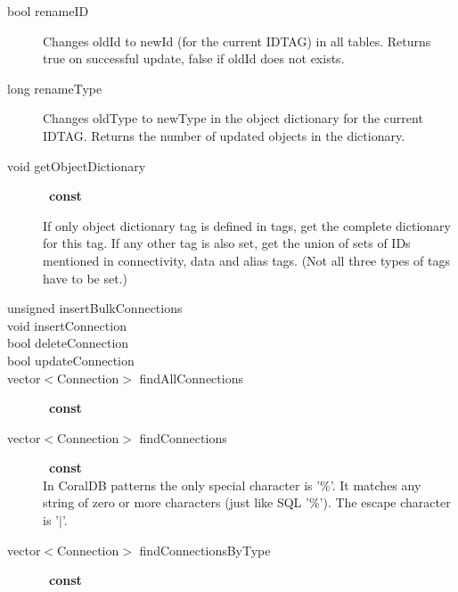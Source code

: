 \begin{description}
\item[bool renameID]
Changes oldId to newId (for the current IDTAG) in all tables.  Returns
true on successful update, false if oldId does not exists.

\item[long renameType]
Changes oldType to newType in the object dictionary for the current
IDTAG.  Returns the number of updated objects in the dictionary.


\item[void getObjectDictionary]~\textbf{const}

  If only object dictionary tag is defined in tags, get the complete
  dictionary for this tag.  If any other tag is also set, get the
  union of sets of IDs mentioned in connectivity, data and alias tags.
  (Not all three types of tags have to be set.)
  
\item[unsigned insertBulkConnections]


\item[void insertConnection]
\item[bool deleteConnection]
\item[bool updateConnection]
\item[vector$<$Connection$>$ findAllConnections]~\textbf{const}


\item[vector$<$Connection$>$ findConnections]~\textbf{const}  \\
In CoralDB patterns the only special character is '\%'. It matches any
string of zero or more characters (just like SQL '\%'). The escape
character is '$|$'.


\item[vector$<$Connection$>$ findConnectionsByType]~\textbf{const}


\end{description}
